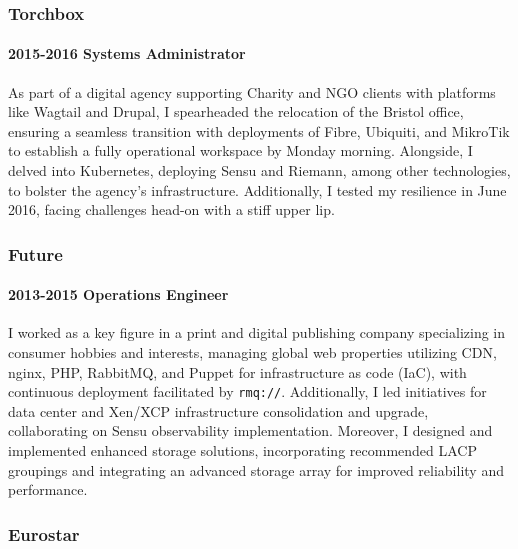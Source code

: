 \documentclass[
]{article}
\begin{document}
\hypertarget{material-office-building-torchbox}{%
\subsubsection{\texorpdfstring{\faBuilding
Torchbox}{ Torchbox}}\label{material-office-building-torchbox}}

\hypertarget{systems-administrator}{%
\paragraph{2015-2016 Systems
Administrator}\label{systems-administrator}}

As part of a digital agency supporting Charity and NGO clients with
platforms like Wagtail and Drupal, I spearheaded the relocation of the
Bristol office, ensuring a seamless transition with deployments of
Fibre, Ubiquiti, and MikroTik to establish a fully operational workspace
by Monday morning. Alongside, I delved into Kubernetes, deploying Sensu
and Riemann, among other technologies, to bolster the agency's
infrastructure. Additionally, I tested my resilience in June 2016,
facing challenges head-on with a stiff upper lip.

\hypertarget{material-office-building-future}{%
\subsubsection{\texorpdfstring{\faBuilding
Future}{ Future}}\label{material-office-building-future}}

\hypertarget{operations-engineer}{%
\paragraph{2013-2015 Operations Engineer}\label{operations-engineer}}

I worked as a key figure in a print and digital publishing company
specializing in consumer hobbies and interests, managing global web
properties utilizing CDN, nginx, PHP, RabbitMQ, and Puppet for
infrastructure as code (IaC), with continuous deployment facilitated by
\texttt{rmq://}. Additionally, I led initiatives for data center and
Xen/XCP infrastructure consolidation and upgrade, collaborating on Sensu
observability implementation. Moreover, I designed and implemented
enhanced storage solutions, incorporating recommended LACP groupings and
integrating an advanced storage array for improved reliability and
performance.

\hypertarget{material-train-eurostar}{%
\subsubsection{\texorpdfstring{\faTrain
Eurostar}{ Eurostar}}\label{material-train-eurostar}}
\end{document}
